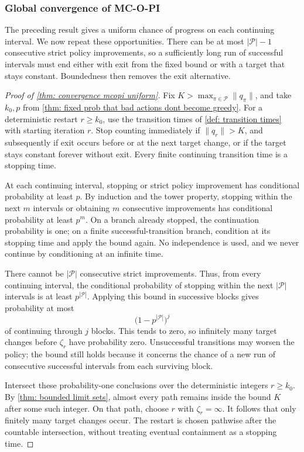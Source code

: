 \subsubsection{Global convergence of MC-O-PI}
The preceding result gives a uniform chance of progress on each continuing interval. We now repeat these opportunities. There can be at most $|\mathcal P|-1$ consecutive strict policy improvements, so a sufficiently long run of successful intervals must end either with exit from the fixed bound or with a target that stays constant. Boundedness then removes the exit alternative.

\begin{proof}[Proof of \autoref{thm: convergence mcopi uniform}]
Fix $K>\max_{\pi\in\mathcal P}\|q_\pi\|$, and take $k_0,p$ from \autoref{thm: fixed prob that bad actions dont become greedy}. For a deterministic restart $r\ge k_0$, use the transition times of \autoref{def: transition times} with starting iteration $r$. Stop counting immediately if $\|q_r\|>K$, and subsequently if exit occurs before or at the next target change, or if the target stays constant forever without exit. Every finite continuing transition time is a stopping time.

At each continuing interval, stopping or strict policy improvement has conditional probability at least $p$. By induction and the tower property, stopping within the next $m$ intervals or obtaining $m$ consecutive improvements has conditional probability at least $p^m$. On a branch already stopped, the continuation probability is one; on a finite successful-transition branch, condition at its stopping time and apply the bound again. No independence is used, and we never continue by conditioning at an infinite time.

There cannot be $|\mathcal P|$ consecutive strict improvements. Thus, from every continuing interval, the conditional probability of stopping within the next $|\mathcal P|$ intervals is at least $p^{|\mathcal P|}$. Applying this bound in successive blocks gives probability at most
\[
\big(1-p^{|\mathcal P|}\big)^j
\]
of continuing through $j$ blocks. This tends to zero, so infinitely many target changes before $\zeta_r$ have probability zero. Unsuccessful transitions may worsen the policy; the bound still holds because it concerns the chance of a new run of consecutive successful intervals from each surviving block.

Intersect these probability-one conclusions over the deterministic integers $r\ge k_0$. By \autoref{thm: bounded limit sets}, almost every path remains inside the bound $K$ after some such integer. On that path, choose $r$ with $\zeta_r=\infty$. It follows that only finitely many target changes occur. The restart is chosen pathwise after the countable intersection, without treating eventual containment as a stopping time.


\end{proof}
